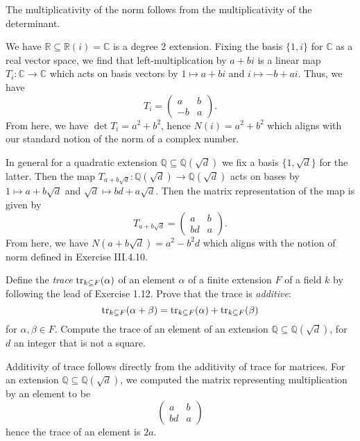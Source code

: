 \documentclass[../../master.tex]{subfiles}
\begin{document}
\begin{solution}
    The multiplicativity of the norm follows from the multiplicativity of the determinant.

    We have $\mathbb{R} \subseteq \mathbb{R}(i) = \mathbb{C}$ is a degree 2 extension.
    Fixing the basis $\{1, i\}$ for $\mathbb{C}$ as a real vector space, we find that left-multiplication by $a + bi$ is a linear map $T_i : \mathbb{C} \to \mathbb{C}$ which acts on basis vectors by $1 \mapsto a + bi$ and $i \mapsto -b + ai$.
    Thus, we have
    \[
    T_i =
    \begin{pmatrix}
        a & b \\
        -b & a
    \end{pmatrix}.
    \]
    From here, we have $\det T_i = a^2 + b^2$, hence $N(i) = a^2 + b^2$ which aligns with our standard notion of the norm of a complex number.

    In general for a quadratic extension $\mathbb{Q} \subseteq \mathbb{Q}(\sqrt{d})$ we fix a basis $\{1, \sqrt{d}\}$ for the latter.
    Then the map $T_{a + b\sqrt{d}} : \mathbb{Q}(\sqrt{d}) \to \mathbb{Q}(\sqrt{d})$ acts on bases by $1 \mapsto a + b\sqrt{d}$ and $\sqrt{d} \mapsto bd + a\sqrt{d}$.
    Then the matrix representation of the map is given by
    \[
    T_{a + b\sqrt{d}} = 
    \begin{pmatrix}
        a & b \\
        bd & a
    \end{pmatrix}.
    \]
    From here, we have $N(a + b\sqrt{d}) = a^2 - b^2d$ which aligns with the notion of norm defined in Exercise III.4.10.
\end{solution}

\begin{problem}
    Define the \textit{trace} $\operatorname{tr}_{k \subseteq F}(\alpha)$ of an element $\alpha$ of a finite extension $F$ of a field $k$ by following the lead of Exercise 1.12.
    Prove that the trace is \textit{additive}:
    \[
        \operatorname{tr}_{k \subseteq F}(\alpha + \beta) = \operatorname{tr}_{k \subseteq F}(\alpha) + \operatorname{tr}_{k \subseteq F}(\beta)
    \]
    for $\alpha, \beta \in F$.
    Compute the trace of an element of an extension $\mathbb{Q} \subseteq \mathbb{Q}(\sqrt{d})$, for $d$ an integer that is not a square.
\end{problem}

\begin{solution}
    Additivity of trace follows directly from the additivity of trace for matrices.
    For an extension $\mathbb{Q} \subseteq \mathbb{Q}(\sqrt{d})$, we computed the matrix representing multiplication by an element to be
    \[
    \begin{pmatrix}
        a & b \\
        bd & a
    \end{pmatrix}
    \]
    hence the trace of an element is $2a$.
\end{solution}
\end{document}
